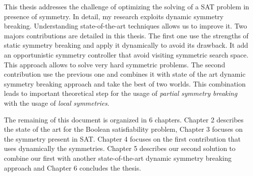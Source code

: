%
%
%

This thesis addresses the challenge of optimizing the solving of a SAT problem in presence of
symmetry. In detail, my research exploits dynamic symmetry breaking.
Understanding state-of-the-art techniques allows us to improve it.
Two majors contributions are detailed in this thesis. The first one use the strengths of static symmetry 
breaking and apply it dynamically to avoid its drawback. It add an opportunistic symmetry controller 
that avoid visiting symmetric search space. This approach allows to solve very hard symmetric problems.
The second contribution use the previous one and combines it with state of the art dynamic 
symmetry breaking approach and take the best of two worlds. This combination leads to 
important theoretical step for the usage of \emph{partial symmetry breaking} with the usage of 
\emph{local symmetries}. 
 


The remaining of this document is organized in 6 chapters. Chapter 2 describes the state of
the art for the Boolean satisfiability problem, Chapter 3 focuses on the symmetry present in SAT.
Chapter 4 focuses on the first contribution that uses dynamically the symmetries.
Chapter 5 describes our second solution to combine our first with another state-of-the-art  
dynamic symmetry breaking approach and Chapter 6 concludes the thesis. 

